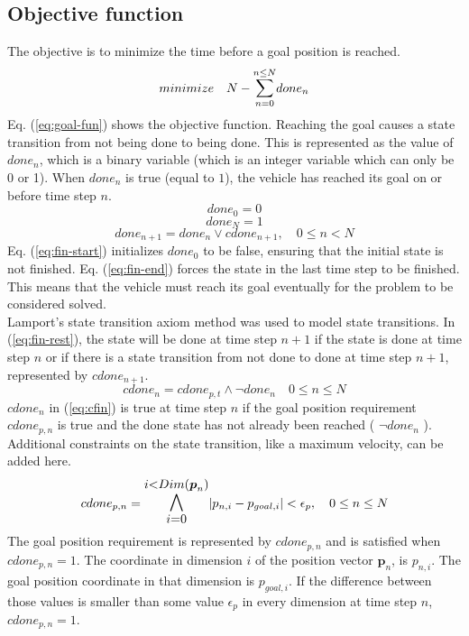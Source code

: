 \subsection{Objective function}
The objective is to minimize the time before a goal position is reached.
\begin{equation}
\label{eq:goal-fun}
minimize \quad N - \mathlarger{\sum}_{n=0}^{n \leq N} done_n
\end{equation}
Eq. (\ref{eq:goal-fun}) shows the objective function. Reaching the goal causes a state transition from not being done to being done. This is represented as the value of $done_n$, which is a binary variable (which is an integer variable which can only be 0 or 1). When $done_n$ is true (equal to $1$), the vehicle has reached its goal on or before time step $n$.
\begin{equation}
\label{eq:fin-start}
done_0 = 0
\end{equation}
\begin{equation}
\label{eq:fin-end}
done_{N} = 1
\end{equation}
\begin{equation}
\label{eq:fin-rest}
done_{n+1} = done_n \vee cdone_{n+1},  \quad 0 \leq n < N
\end{equation}
Eq. (\ref{eq:fin-start}) initializes $done_0$ to be false, ensuring that the initial state is not finished. Eq. (\ref{eq:fin-end}) forces the state in the last time step to be finished. This means that the vehicle must reach its goal eventually for the problem to be considered solved. \\
Lamport's \cite{Lamport1989} state transition axiom method was used to model state transitions. In (\ref{eq:fin-rest}), the state will be done at time step $n+1$ if the state is done at time step $n$ or if there is a state transition from not done to done at time step $n + 1$, represented by $cdone_{n+1}$.
\begin{equation}
\label{eq:cfin}
cdone_n =  cdone_{p,t} \wedge \neg done_n\quad 0 \leq n \leq N
\end{equation}
 $cdone_n$ in (\ref{eq:cfin}) is true at time step $n$ if the goal position requirement $cdone_{p,n}$ is true and the done state has not already been reached ( $ \neg done_n$ ). Additional constraints on the state transition, like a maximum velocity, can be added here.
\begin{equation}
\label{eq:cfin-p}
cdone_{p,n} =  \mathlarger{\mathlarger{\bigwedge_{i = 0}^{i < Dim(\boldsymbol{p}_n)}}} |p_{n,i} - p_{goal, i}| < \epsilon_{p},  \quad 0 \leq n \leq N
\end{equation}
The goal position requirement is represented by $cdone_{p,n}$ and is satisfied when $cdone_{p,n} = 1$. The coordinate in dimension $i$ of the position vector $\boldsymbol{p}_n$, is $p_{n,i}$. The goal position coordinate in that dimension is $p_{goal, i}$. If the difference between those values is smaller than some value $\epsilon_p$ in every dimension at time step $n$,  $cdone_{p,n} = 1$.
